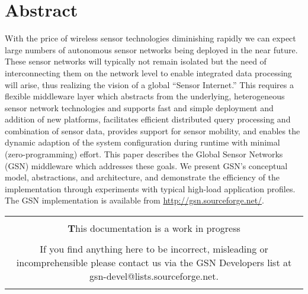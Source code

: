 \chapter{Abstract}
  With the price of wireless sensor technologies diminishing rapidly we can
  expect large numbers of autonomous sensor networks being deployed in the near
  future. These sensor networks will typically not remain isolated but the need
  of interconnecting them on the network level to enable integrated data
  processing will arise, thus realizing the vision of a global ``Sensor
  Internet.'' This requires a flexible middleware layer which abstracts from
  the underlying, heterogeneous sensor network technologies and supports fast
  and simple deployment and addition of new platforms, facilitates efficient
  distributed query processing and combination of sensor data, provides support
  for sensor mobility, and enables the dynamic adaption of the system
  configuration during runtime with minimal (zero-programming) effort. This
  paper describes the Global Sensor Networks (GSN) middleware which addresses
  these goals. We present GSN's conceptual model, abstractions, and
  architecture, and demonstrate the efficiency of the implementation through
  experiments with typical high-load application profiles. The GSN
  implementation is available from \url{http://gsn.sourceforge.net/}.	
  
  
  
\begin{table*}[!htp]
	\centering
	{\normalfont\footnotesize
	\begin{tabulary}{\textwidth}{|C|}%
	\hline
	\\
		\textbf This documentation is a work in progress \\
		\\
		If you find anything here to be incorrect, misleading or incomprehensible please contact us via the GSN Developers list at gsn-devel@lists.sourceforge.net.  \\
		\\
	\hline

	\end{tabulary}
	}
\end{table*}



 
 \newpage